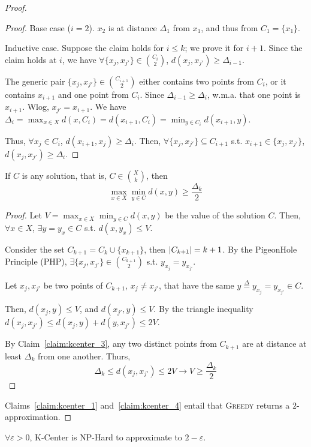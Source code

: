 \begin{proof}
\begin{proof}
            Base case ($i=2$).
            $x_2$ is at distance $\Delta_1$ from $x_1$, and thus from $C_1 = \{x_1\}$.

            Inductive case. Suppose the claim holds for $i \leq k$; we prove it for $i+1$.
            Since the claim holds at $i$, we have $\forall \{ x_j, x_{j'} \} \in \binom{C_i}{2}$, $d(x_j, x_{j'}) \geq \Delta_{i-1}$.

            The generic pair $\{ x_j, x_{j'} \} \in \binom{C_{i+1}}{2}$ either contains two points from $C_i$, or it contains $x_{i+1}$ and one point from $C_i$.
            Since $\Delta_{i-1} \geq \Delta_i$, w.m.a. that one point is $x_{i+1}$. Wlog, $x_{j'} = x_{i+1}$.
            We have $\Delta_i = \max_{x \in X} d(x, C_i) = d(x_{i+1}, C_i) = \min_{y \in C_i} d(x_{i+1}, y)$.

            Thus, $\forall x_j \in C_i$, $d(x_{i+1}, x_j) \geq \Delta_i$.
            Then, $\forall \{ x_j, x_{j'} \} \subseteq C_{i+1}$ s.t. $x_{i+1} \in \{ x_j, x_{j'} \}$, $d( x_j, x_{j'} ) \geq \Delta_i$.
        \end{proof}

        \begin{claim}\label{claim:kcenter_4}
            If $C$ is any solution, that is, $C \in \binom{X}{k}$, then
            \[ \max_{x \in X} \min_{y \in C} d(x,y) \geq \frac{\Delta_k}{2} \]
        \end{claim}
        \begin{proof}
            Let $V = \max_{x \in X} \min_{y \in C} d(x,y)$ be the value of the solution $C$.
            Then, $\forall x \in X$, $\exists y = y_x \in C$ s.t. $d(x, y_x) \leq V$.

            Consider the set $C_{k+1} = C_k \cup \{ x_{k+1} \}$, then $\vert C_{k+1} \vert = k+1$.
            By the PigeonHole Principle (PHP), $\exists \{ x_j, x_{j'} \} \in \binom{C_{k+1}}{2}$ s.t. $y_{x_j} = y_{x_{j'}}$.

            Let $x_j, x_{j'}$ be two points of $C_{k+1}$, $x_j \neq x_{j'}$, that have the same $y \overset{\Delta}{=} y_{x_j} = y_{x_{j'}} \in C$.

            Then, $d(x_j, y) \leq V$, and $d(x_{j'}, y) \leq V$.
            By the triangle inequality $d(x_j, x_{j'}) \leq d(x_j, y) + d(y, x_{j'}) \leq 2V$.

            By Claim~\ref{claim:kcenter_3}, any two distinct points from $C_{k+1}$ are at distance at least $\Delta_k$ from one another.
            Thurs,
            \[ \Delta_k \leq d(x_j, x_{j'}) \leq 2V \rightarrow V \geq \frac{\Delta_k}{2} \]
        \end{proof}

        Claims~\ref{claim:kcenter_1} and~\ref{claim:kcenter_4} entail that \textsc{Greedy} returns a $2$-approximation.
    \end{proof}

    \begin{theorem}
        $\forall \varepsilon > 0$, K-Center is NP-Hard to approximate to $2 - \varepsilon$.
    \end{theorem}
